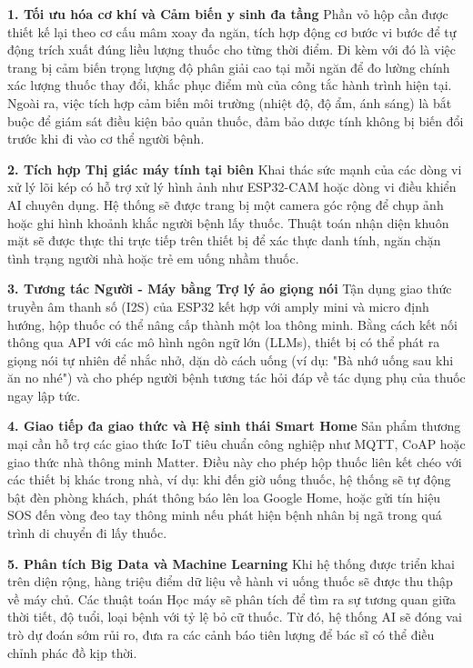 \documentclass[12pt, a4paper, oneside]{article}
\begin{document}
\textbf{1. Tối ưu hóa cơ khí và Cảm biến y sinh đa tầng}
Phần vỏ hộp cần được thiết kế lại theo cơ cấu mâm xoay đa ngăn, tích hợp động cơ bước vi bước để tự động trích xuất đúng liều lượng thuốc cho từng thời điểm. Đi kèm với đó là việc trang bị cảm biến trọng lượng độ phân giải cao tại mỗi ngăn để đo lường chính xác lượng thuốc thay đổi, khắc phục điểm mù của công tắc hành trình hiện tại. Ngoài ra, việc tích hợp cảm biến môi trường (nhiệt độ, độ ẩm, ánh sáng) là bắt buộc để giám sát điều kiện bảo quản thuốc, đảm bảo dược tính không bị biến đổi trước khi đi vào cơ thể người bệnh.

\textbf{2. Tích hợp Thị giác máy tính tại biên}
Khai thác sức mạnh của các dòng vi xử lý lõi kép có hỗ trợ xử lý hình ảnh như ESP32-CAM hoặc dòng vi điều khiển AI chuyên dụng. Hệ thống sẽ được trang bị một camera góc rộng để chụp ảnh hoặc ghi hình khoảnh khắc người bệnh lấy thuốc. Thuật toán nhận diện khuôn mặt sẽ được thực thi trực tiếp trên thiết bị để xác thực danh tính, ngăn chặn tình trạng người nhà hoặc trẻ em uống nhầm thuốc.

\textbf{3. Tương tác Người - Máy bằng Trợ lý ảo giọng nói}
Tận dụng giao thức truyền âm thanh số (I2S) của ESP32 kết hợp với amply mini và micro định hướng, hộp thuốc có thể nâng cấp thành một loa thông minh. Bằng cách kết nối thông qua API với các mô hình ngôn ngữ lớn (LLMs), thiết bị có thể phát ra giọng nói tự nhiên để nhắc nhở, dặn dò cách uống (ví dụ: "Bà nhớ uống sau khi ăn no nhé") và cho phép người bệnh tương tác hỏi đáp về tác dụng phụ của thuốc ngay lập tức.

\textbf{4. Giao tiếp đa giao thức và Hệ sinh thái Smart Home}
Sản phẩm thương mại cần hỗ trợ các giao thức IoT tiêu chuẩn công nghiệp như MQTT, CoAP hoặc giao thức nhà thông minh Matter. Điều này cho phép hộp thuốc liên kết chéo với các thiết bị khác trong nhà, ví dụ: khi đến giờ uống thuốc, hệ thống sẽ tự động bật đèn phòng khách, phát thông báo lên loa Google Home, hoặc gửi tín hiệu SOS đến vòng đeo tay thông minh nếu phát hiện bệnh nhân bị ngã trong quá trình di chuyển đi lấy thuốc.

\textbf{5. Phân tích Big Data và Machine Learning}
Khi hệ thống được triển khai trên diện rộng, hàng triệu điểm dữ liệu về hành vi uống thuốc sẽ được thu thập về máy chủ. Các thuật toán Học máy sẽ phân tích để tìm ra sự tương quan giữa thời tiết, độ tuổi, loại bệnh với tỷ lệ bỏ cữ thuốc. Từ đó, hệ thống AI sẽ đóng vai trò dự đoán sớm rủi ro, đưa ra các cảnh báo tiên lượng để bác sĩ có thể điều chỉnh phác đồ kịp thời.
\end{document}
